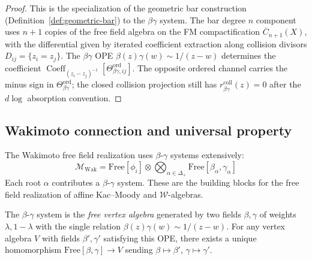 \begin{proof}
This is the specialization of the geometric bar construction
(Definition~\ref{def:geometric-bar}) to the $\beta\gamma$ system.
The bar degree $n$ component uses $n+1$ copies of the free field algebra
on the FM compactification $\overline{C}_{n+1}(X)$, with the differential
given by iterated coefficient extraction along collision divisors
$D_{ij} = \{z_i = z_j\}$.
The $\beta\gamma$ OPE $\beta(z)\gamma(w) \sim 1/(z-w)$ determines the
coefficient
$\operatorname{Coeff}_{(z_i-z_j)^{-1}}
[\Theta_{\beta\gamma,ij}^{\mathrm{ord}}]$. The opposite ordered
channel carries the minus sign in
$\Theta_{\beta\gamma}^{\mathrm{ord}}$; the closed collision projection
still has $r^{\mathrm{coll}}_{\beta\gamma}(z)=0$ after the $d\log$
absorption convention.
\end{proof}

\subsection{Wakimoto connection and universal property}

\begin{remark}
The Wakimoto free field realization uses $\beta$-$\gamma$ systems extensively:
\[
\mathcal{M}_{\mathrm{Wak}} = \mathrm{Free}[\phi_i] \otimes \bigotimes_{\alpha \in \Delta_+} \mathrm{Free}[\beta_\alpha, \gamma_\alpha]
\]
Each root $\alpha$ contributes a $\beta$-$\gamma$ system. These are the building blocks
for the free field realization of affine Kac--Moody and $\mathcal{W}$-algebras.
\end{remark}

\begin{theorem}
\label{thm:beta-gamma-universal}
The $\beta$-$\gamma$ system is the \emph{free vertex algebra} generated by two fields
$\beta, \gamma$ of weights $\lambda, 1-\lambda$ with the single relation
$\beta(z)\gamma(w) \sim 1/(z-w)$.
For any vertex algebra $V$ with fields $\beta', \gamma'$ satisfying
this OPE, there exists a unique homomorphism
$\mathrm{Free}[\beta, \gamma] \to V$
sending $\beta \mapsto \beta'$, $\gamma \mapsto \gamma'$.
\end{theorem}


